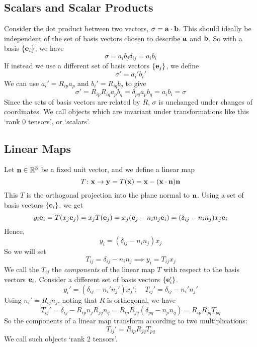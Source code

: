 \subsection{Scalars and Scalar Products}
Consider the dot product between two vectors, \(\sigma = \vb a \cdot \vb b\). This should ideally be independent of the set of basis vectors chosen to describe \(\vb a\) and \(\vb b\). So with a basis \(\{ \vb e_i \}\), we have
\[ \sigma = a_i b_j \delta_{ij} = a_i b_i \]
If instead we use a different set of basis vectors \(\{ \vb e_j \}\), we define
\[ \sigma' = a_i' b_i' \]
We can use \(a_i' = R_{ip} a_p\) and \(b_i' = R_{iq} b_q\) to give
\[ \sigma' = R_{ip} R_{iq} a_p b_q = \delta_{pq} a_p b_q = a_i b_i = \sigma \]
Since the sets of basis vectors are related by \(R\), \(\sigma\) is unchanged under changes of coordinates. We call objects which are invariant under transformations like this `rank 0 tensors', or `scalars'.

\subsection{Linear Maps}
Let \(\vb n \in \mathbb R^3\) be a fixed unit vector, and we define a linear map
\[ T \colon \vb x \to \vb y = T(\vb x) = \vb x - (\vb x \cdot \vb n) \vb n \]
This \(T\) is the orthogonal projection into the plane normal to \(\vb n\). Using a set of basis vectors \(\{ \vb e_i \}\), we get
\[ y_i \vb e_i = T(x_j \vb e_j) = x_j T(\vb e_j) = x_j (\vb e_j - n_i n_j \vb e_i) = (\delta_{ij} - n_i n_j) x_j \vb e_i \]
Hence,
\[ y_i = (\delta_{ij} - n_i n_j) x_j \]
So we will set
\[ T_{ij} = \delta_{ij} - n_i n_j \implies y_i = T_{ij} x_j \]
We call the \(T_{ij}\) the \textit{components} of the linear map \(T\) with respect to the basis vectors \(\vb e_i\). Consider a different set of basis vectors \(\{ \vb e_i' \}\).
\[ y_i' = (\delta_{ij} - n_i' n_j') x_j';\quad T_{ij}' = \delta_{ij} - n_i' n_j' \]
Using \(n_i' = R_{ij} n_j\), noting that \(R\) is orthogonal, we have
\[ T_{ij}' = \delta_{ij} - R_{ip} n_j R_{jq} n_q = R_{ip} R_{jq} (\delta_{pq} - n_p n_q) = R_{ip} R_{jq} T_{pq} \]
So the components of a linear map transform according to two multiplications:
\[ T_{ij}' = R_{ip} R_{jq} T_{pq} \]
We call such objects `rank 2 tensors'.
